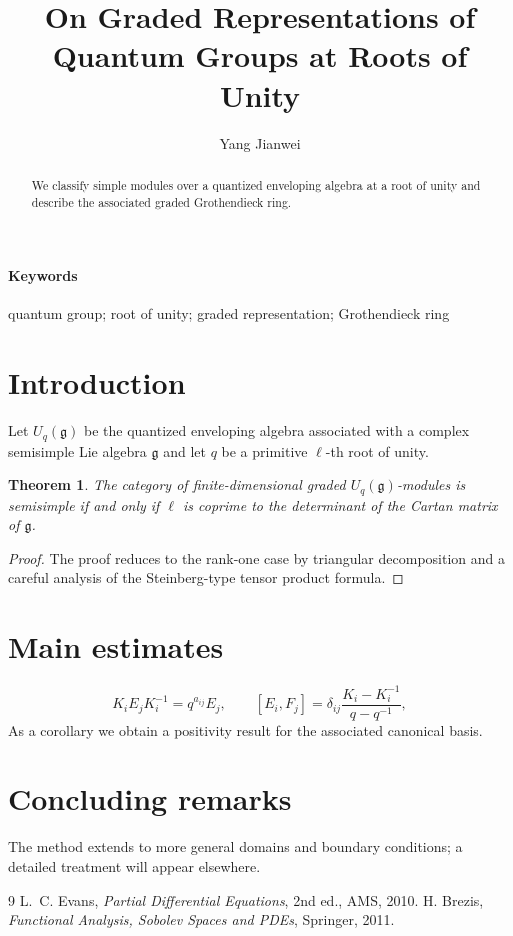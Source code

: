 \documentclass[11pt,reqno]{amsart}
\title{On Graded Representations of Quantum Groups at Roots of Unity}
\author{Yang Jianwei}
\date{}
\def\YTfallback{1}
\newtheorem{theorem}{Theorem}[section]
\begin{document}
\maketitle
\ifdefined\YTfallback
\noindent{}
\bigskip
\fi
\begin{abstract}
We classify simple modules over a quantized enveloping algebra at a root of unity and describe the associated graded Grothendieck ring.
\end{abstract}
\paragraph{Keywords} quantum group; root of unity; graded representation; Grothendieck ring

\section{Introduction}
Let $U_q(\mathfrak{g})$ be the quantized enveloping algebra associated with a complex semisimple Lie algebra $\mathfrak{g}$ and let $q$ be a primitive $\ell$-th root of unity.

\begin{theorem}
The category of finite-dimensional graded $U_q(\mathfrak{g})$-modules is semisimple if and only if $\ell$ is coprime to the determinant of the Cartan matrix of $\mathfrak{g}$.
\end{theorem}

\begin{proof}
The proof reduces to the rank-one case by triangular decomposition and a careful analysis of the Steinberg-type tensor product formula.
\end{proof}

\section{Main estimates}
\begin{equation}
K_i E_j K_i^{-1}=q^{a_{ij}}E_j,\qquad [E_i,F_j]=\delta_{ij}\frac{K_i-K_i^{-1}}{q-q^{-1}},
\end{equation}
As a corollary we obtain a positivity result for the associated canonical basis.

\section{Concluding remarks}
The method extends to more general domains and boundary conditions; a detailed
treatment will appear elsewhere.

\begin{thebibliography}{9}
 L.~C. Evans, \emph{Partial Differential Equations}, 2nd ed., AMS, 2010.
 H. Brezis, \emph{Functional Analysis, Sobolev Spaces and PDEs}, Springer, 2011.
\end{thebibliography}
\end{document}
